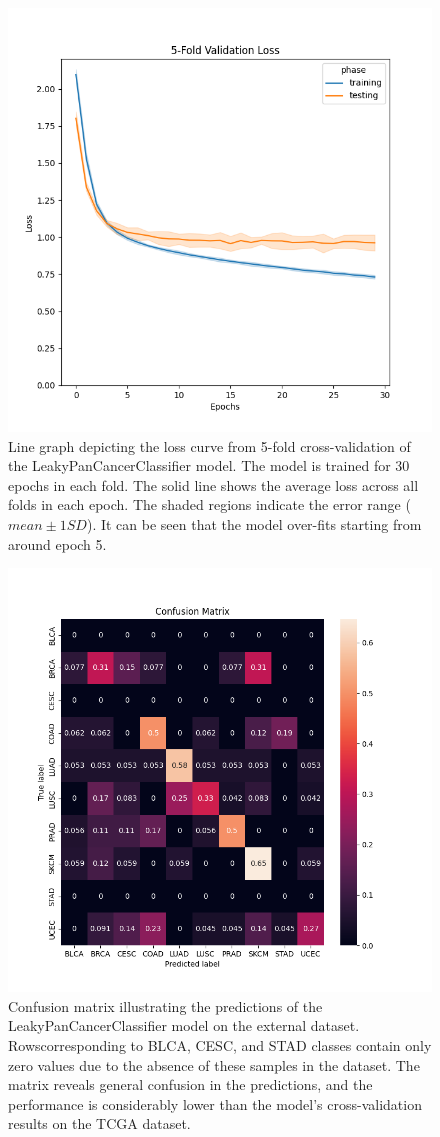 \documentclass{l4proj}
\begin{document}
\begin{appendices}
\begin{figure}
    \centering
    \includegraphics[width=0.75\linewidth]{images/fold_loss_curve.png}
    \caption{Line graph depicting the loss curve from 5-fold cross-validation of the LeakyPanCancerClassifier model. The model is trained for 30 epochs in each fold. The solid line shows the average loss across all folds in each epoch. The shaded regions indicate the error range ($mean\pm 1SD$). It can be seen that the model over-fits starting from around epoch 5.}
    \label{fig:fold_losses}
\end{figure}

\begin{figure}
    \centering
    \includegraphics[width=.75\linewidth]{images/ext_conf.png}
    \caption{Confusion matrix illustrating the predictions of the LeakyPanCancerClassifier model on the external dataset. Rowscorresponding to BLCA, CESC, and STAD classes contain only zero values due to the absence of these samples in the dataset. The matrix reveals general confusion in the predictions, and the performance is considerably lower than the model's cross-validation results on the TCGA dataset.}
    \label{fig:ext_conf}
\end{figure}


\end{appendices}
\end{document}
